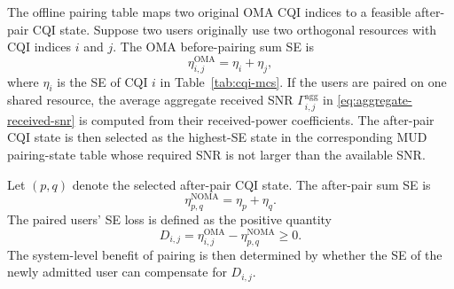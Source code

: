 The offline pairing table maps two original OMA CQI indices to a feasible after-pair CQI state. Suppose two users originally use two orthogonal resources with CQI indices $i$ and $j$. The OMA before-pairing sum SE is
\begin{equation}
    \eta^{\mathrm{OMA}}_{i,j}
    =
    \eta_i+\eta_j,
\end{equation}
where $\eta_i$ is the SE of CQI $i$ in Table~\ref{tab:cqi-mcs}. If the users are paired on one shared resource, the average aggregate received SNR $\Gamma^{\mathrm{agg}}_{i,j}$ in \eqref{eq:aggregate-received-snr} is computed from their received-power coefficients. The after-pair CQI state is then selected as the highest-SE state in the corresponding MUD pairing-state table whose required SNR is not larger than the available SNR.

Let $(p,q)$ denote the selected after-pair CQI state. The after-pair sum SE is
\begin{equation}
    \eta^{\mathrm{NOMA}}_{p,q}
    =
    \eta_p+\eta_q.
\end{equation}
The paired users' SE loss is defined as the positive quantity
\begin{equation}
    D_{i,j}
    =
    \eta^{\mathrm{OMA}}_{i,j}
    -
    \eta^{\mathrm{NOMA}}_{p,q}
    \geq 0.
    \label{eq:positive-se-loss}
\end{equation}
The system-level benefit of pairing is then determined by whether the SE of the newly admitted user can compensate for $D_{i,j}$.

